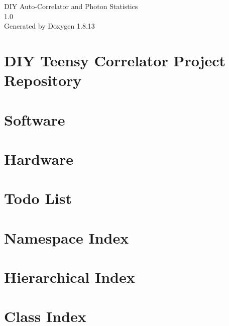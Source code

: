 \documentclass[twoside]{book}
\newcommand{\+}{\discretionary{\mbox{\scriptsize$\hookleftarrow$}}{}{}}
\newcommand{\clearemptydoublepage}{%
  \newpage{\pagestyle{empty}\cleardoublepage}%
}
\begin{document}
\hypersetup{pageanchor=false,
             bookmarksnumbered=true,
             pdfencoding=unicode
            }
\begin{titlepage}
\vspace*{7cm}
\begin{center}%
{\Large D\+IY Auto-\/\+Correlator and Photon Statistics \\[1ex]\large 1.\+0 }\\
\vspace*{1cm}
{\large Generated by Doxygen 1.8.13}\\
\end{center}
\end{titlepage}
\clearemptydoublepage
{}
\tableofcontents
\clearemptydoublepage
{}
\hypersetup{pageanchor=true}

\chapter{D\+IY Teensy Correlator Project Repository}
\label{index}\hypertarget{index}{}
\chapter{Software}
\label{md_code_software_README}

\chapter{Hardware}
\label{md_code_hardware_README}

\chapter{Todo List}
\label{todo}

\chapter{Namespace Index}

\chapter{Hierarchical Index}

\chapter{Class Index}

\end{document}
